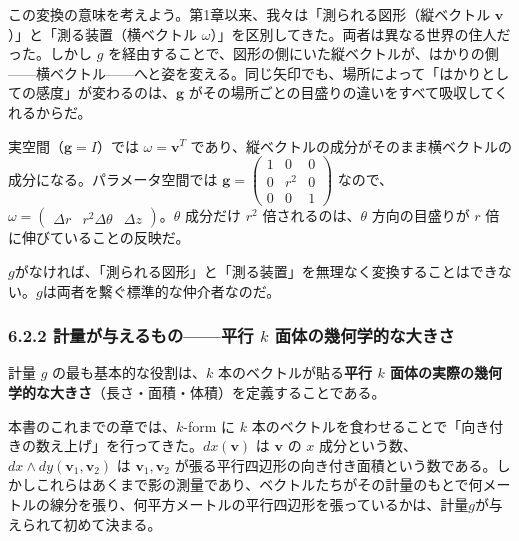 \documentclass[a4paper,12pt,openany]{book}
\begin{document}
この変換の意味を考えよう。第1章以来、我々は「測られる図形（縦ベクトル
\(\mathbf{v}\)）」と「測る装置（横ベクトル
\(\omega\)）」を区別してきた。両者は異なる世界の住人だった。しかし \(g\)
を経由することで、図形の側にいた縦ベクトルが、はかりの側——横ベクトル——へと姿を変える。同じ矢印でも、場所によって「はかりとしての感度」が変わるのは、\(\mathbf{g}\)
がその場所ごとの目盛りの違いをすべて吸収してくれるからだ。

実空間（\(\mathbf{g}=I\)）では \(\omega = \mathbf{v}^T\)
であり、縦ベクトルの成分がそのまま横ベクトルの成分になる。パラメータ空間では
\(\mathbf{g} = \begin{pmatrix} 1 & 0 & 0 \\ 0 & r^2 & 0 \\ 0 & 0 & 1 \end{pmatrix}\)
なので、\(\omega = \begin{pmatrix} \Delta r & r^2\Delta\theta & \Delta z \end{pmatrix}\)。\(\theta\)
成分だけ \(r^2\) 倍されるのは、\(\theta\) 方向の目盛りが \(r\)
倍に伸びていることの反映だ。

\(g\)がなければ、「測られる図形」と「測る装置」を無理なく変換することはできない。\(g\)は両者を繫ぐ標準的な仲介者なのだ。

\hypertarget{ux8a08ux91cfux304cux4e0eux3048ux308bux3082ux306eux5e73ux884c-k-ux9762ux4f53ux306eux5e7eux4f55ux5b66ux7684ux306aux5927ux304dux3055}{%
\subsubsection{\texorpdfstring{6.2.2 計量が与えるもの——平行 \(k\)
面体の幾何学的な大きさ}{6.2.2 計量が与えるもの——平行 k 面体の幾何学的な大きさ}}\label{ux8a08ux91cfux304cux4e0eux3048ux308bux3082ux306eux5e73ux884c-k-ux9762ux4f53ux306eux5e7eux4f55ux5b66ux7684ux306aux5927ux304dux3055}}

計量 \(g\) の最も基本的な役割は、\(k\)
本のベクトルが貼る\textbf{平行 $k$ 面体の実際の幾何学的な大きさ}（長さ・面積・体積）を定義することである。

本書のこれまでの章では、\(k\)-form に \(k\)
本のベクトルを食わせることで「向き付きの数え上げ」を行ってきた。\(dx(\mathbf{v})\)
は \(\mathbf{v}\) の \(x\)
成分という数、\(dx \wedge dy(\mathbf{v}_1, \mathbf{v}_2)\) は
\(\mathbf{v}_1, \mathbf{v}_2\)
が張る平行四辺形の向き付き面積という数である。しかしこれらはあくまで影の測量であり、ベクトルたちがその計量のもとで何メートルの線分を張り、何平方メートルの平行四辺形を張っているかは、計量\(g\)が与えられて初めて決まる。
\end{document}
